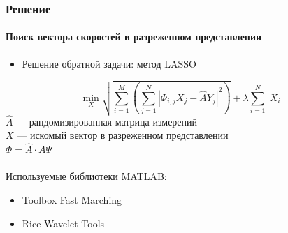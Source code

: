 \documentclass{beamer}
\begin{document}
\begin{frame}
\frametitle{Решение}
\framesubtitle{Поиск вектора скоростей в разреженном представлении}
\begin{itemize}
	\item Решение обратной задачи: метод LASSO
\end{itemize}
$$ \min_X  \sqrt{\displaystyle\sum_{i=1}^{M} (\displaystyle\sum_{j=1}^N | \Phi_{i,j}X_j - \hat{A}Y_j |^2)} + \lambda \displaystyle\sum_{i=1}^N |X_i| $$
\small
$\hat{A}$ --- рандомизированная матрица измерений\\
$X$ --- искомый вектор в разреженном представлении\\
$\Phi=\hat{A}\cdot A\Psi$\\
\hfill\\
Используемые библиотеки MATLAB:
\begin{itemize}
\item Toolbox Fast Marching
\item Rice Wavelet Tools
\end{itemize}

\end{frame}
\end{document}
